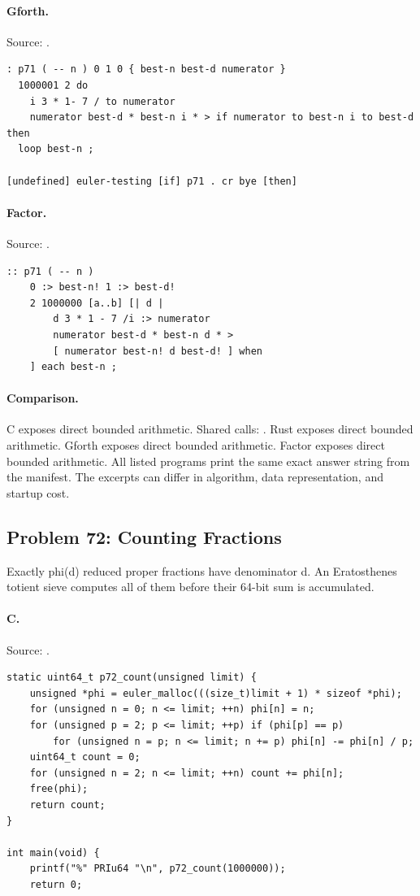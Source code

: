 \paragraph{Gforth.} Source: .
\begin{lstlisting}
: p71 ( -- n ) 0 1 0 { best-n best-d numerator }
  1000001 2 do
    i 3 * 1- 7 / to numerator
    numerator best-d * best-n i * > if numerator to best-n i to best-d then
  loop best-n ;

[undefined] euler-testing [if] p71 . cr bye [then]
\end{lstlisting}

\paragraph{Factor.} Source: .
\begin{lstlisting}
:: p71 ( -- n )
    0 :> best-n! 1 :> best-d!
    2 1000000 [a..b] [| d |
        d 3 * 1 - 7 /i :> numerator
        numerator best-d * best-n d * >
        [ numerator best-n! d best-d! ] when
    ] each best-n ;
\end{lstlisting}

\paragraph{Comparison.}
C exposes direct bounded arithmetic. Shared calls: \texttt{}. Rust exposes direct bounded arithmetic. Gforth exposes direct bounded arithmetic. Factor exposes direct bounded arithmetic.
All listed programs print the same exact answer string from the manifest. The excerpts can differ in algorithm, data representation, and startup cost.

\subsection{Problem 72: Counting Fractions}
\label{walkthrough:p72}
Exactly phi(d) reduced proper fractions have denominator d. An Eratosthenes totient sieve computes all of them before their 64-bit sum is accumulated.

\paragraph{C.} Source: .
\begin{lstlisting}
static uint64_t p72_count(unsigned limit) {
    unsigned *phi = euler_malloc(((size_t)limit + 1) * sizeof *phi);
    for (unsigned n = 0; n <= limit; ++n) phi[n] = n;
    for (unsigned p = 2; p <= limit; ++p) if (phi[p] == p)
        for (unsigned n = p; n <= limit; n += p) phi[n] -= phi[n] / p;
    uint64_t count = 0;
    for (unsigned n = 2; n <= limit; ++n) count += phi[n];
    free(phi);
    return count;
}

int main(void) {
    printf("%" PRIu64 "\n", p72_count(1000000));
    return 0;
\end{lstlisting}

